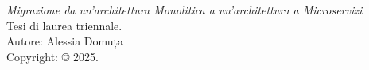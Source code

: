 \newpage
\thispagestyle{empty} %
\vspace*{\fill} %
\noindent
\textit{Migrazione da un'architettura Monolitica a un'architettura a Microservizi} \\
Tesi di laurea triennale. \\
Autore: Alessia Domuța \\
Copyright: © 2025.

\newpage
